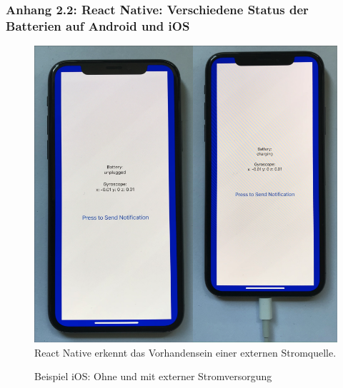 \documentclass[a4paper]{scrartcl}
\begin{document}
\newpage

\subsubsection*{Anhang 2.2: React Native: Verschiedene Status der Batterien auf Android und iOS}

\begin{figure}[H]
	\centering
	\caption{Beispiel iOS: Ohne und mit externer Stromversorgung}
	\includegraphics[scale=0.3]{_assets/iOS_unpugged_charging.png} \\
	React Native erkennt das Vorhandensein einer externen Stromquelle. 
\end{figure}
\end{document}
